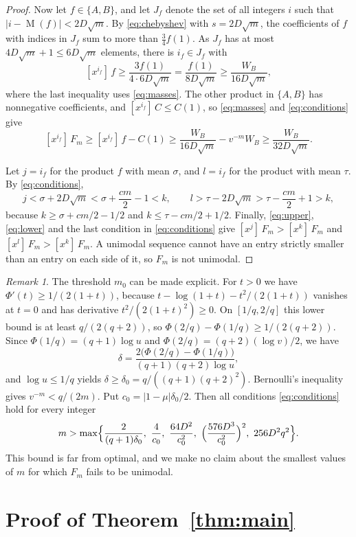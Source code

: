 \documentclass[11pt]{amsart}
\theoremstyle{remark}
\newtheorem{remark}[theorem]{Remark}
\numberwithin{equation}{section}
\newcommand{\coef}[2]{[x^{#1}]\,#2}
\DeclareMathOperator{\M}{M}
\begin{document}
\begin{proof}
Now let $f\in\{A,B\}$, and let $J_f$ denote the set of all integers $i$ such that ${|i-\M(f)|<2D\sqrt m}$. By \eqref{eq:chebyshev} with $s=2D\sqrt m$, the coefficients of $f$ with indices in $J_f$ sum to more than $\frac34f(1)$. As $J_f$ has at most $4D\sqrt m+1\le 6D\sqrt m$ elements, there is $i_f\in J_f$ with
\[
\coef{i_f}{f}\ge\frac{3f(1)}{4\cdot 6D\sqrt m}=\frac{f(1)}{8D\sqrt m}\ge\frac{W_B}{16D\sqrt m},
\]
where the last inequality uses \eqref{eq:masses}. The other product in $\{A,B\}$ has nonnegative coefficients, and $\coef{i_f}{C}\le C(1)$, so \eqref{eq:masses} and \eqref{eq:conditions} give
\begin{equation}\label{eq:lower}
\coef{i_f}{F_m}\ge\coef{i_f}{f}-C(1)\ge\frac{W_B}{16D\sqrt m}-v^{-m}W_B\ge\frac{W_B}{32D\sqrt m}.
\end{equation}

Let $j=i_f$ for the product $f$ with mean $\sigma$, and $l=i_f$ for the product with mean $\tau$. By \eqref{eq:conditions},
\[
j<\sigma+2D\sqrt m<\sigma+\frac{cm}{2}-1<k,\qquad l>\tau-2D\sqrt m>\tau-\frac{cm}{2}+1>k,
\]
because $k\ge\sigma+cm/2-1/2$ and $k\le\tau-cm/2+1/2$. Finally, \eqref{eq:upper}, \eqref{eq:lower} and the last condition in \eqref{eq:conditions} give $\coef{j}{F_m}>\coef{k}{F_m}$ and $\coef{l}{F_m}>\coef{k}{F_m}$. A unimodal sequence cannot have an entry strictly smaller than an entry on each side of it, so $F_m$ is not unimodal.
\end{proof}

\begin{remark}\label{rem:effective}
The threshold $m_0$ can be made explicit. For $t>0$ we have ${\Phi'(t)\ge 1/(2(1+t))}$, because $t-\log(1+t)-t^2/(2(1+t))$ vanishes at $t=0$ and has derivative $t^2/(2(1+t)^2)\ge 0$. On $[1/q,2/q]$ this lower bound is at least $q/(2(q+2))$, so $\Phi(2/q)-\Phi(1/q)\ge 1/(2(q+2))$. Since $\Phi(1/q)=(q+1)\log u$ and $\Phi(2/q)=(q+2)(\log v)/2$, we have
\[
\delta=\frac{2\bigl(\Phi(2/q)-\Phi(1/q)\bigr)}{(q+1)(q+2)\log u},
\]
and $\log u\le 1/q$ yields $\delta\ge\delta_0=q/((q+1)(q+2)^2)$. Bernoulli's inequality gives $v^{-m}<q/(2m)$. Put $c_0=|1-\mu|\delta_0/2$. Then all conditions \eqref{eq:conditions} hold for every integer
\[
m>\max\Bigl\{\frac{2}{(q+1)\delta_0},\ \frac{4}{c_0},\ \frac{64D^2}{c_0^2},\ \Bigl(\frac{576D^3}{c_0^2}\Bigr)^2,\ 256D^2q^2\Bigr\}.
\]
This bound is far from optimal, and we make no claim about the smallest values of $m$ for which $F_m$ fails to be unimodal.
\end{remark}

\section{Proof of Theorem~\ref{thm:main}}\label{sec:main}
\end{document}
